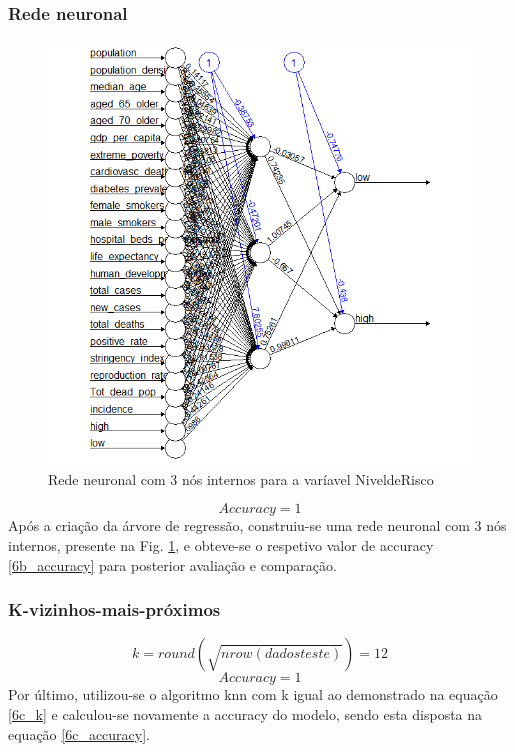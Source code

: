 \documentclass[conference]{IEEEtran}
\begin{document}
\subsubsection{Rede neuronal}
\begin{figure}[htbp]
\centerline{\includegraphics[width=0.95\columnwidth]{images/06_2.png}}
\caption{Rede neuronal com 3 nós internos para a varíavel NiveldeRisco}
\label{6b_neural}
\end{figure}
\begin{equation}
Accuracy = 1\label{6b_accuracy}
\end{equation}
Após a criação da árvore de regressão, construiu-se uma rede neuronal com 3 nós internos, presente na Fig. \ref{6b_neural}, e obteve-se o respetivo valor de accuracy \eqref{6b_accuracy} para posterior avaliação e comparação.


\subsubsection{K-vizinhos-mais-próximos}
\begin{equation}
k = round(\sqrt{nrow(dadosteste)})=12\label{6c_k}
\end{equation}
\begin{equation}
Accuracy = 1\label{6c_accuracy}
\end{equation}
Por último, utilizou-se o algoritmo knn com k igual ao demonstrado na equação \eqref{6c_k} e calculou-se novamente a accuracy do modelo, sendo esta disposta na equação \eqref{6c_accuracy}.
\end{document}
